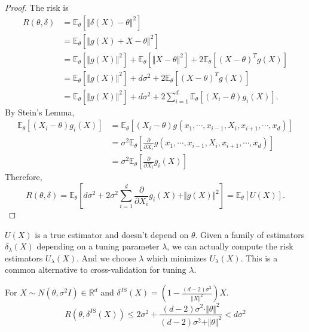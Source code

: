 \documentclass[a4paper]{article}
\begin{document}
\begin{proof}
	The risk is
	\begin{equation}
		\begin{aligned}
			R(\theta,\delta) &= \mathbb{E}_\theta[\Vert \delta(X) - \theta \Vert^2] \\
			&= \mathbb{E}_\theta[\Vert g(X) + X - \theta \Vert^2] \\
			&= \mathbb{E}_\theta[\Vert g(X) \Vert^2] + \mathbb{E}_\theta[\Vert X - \theta \Vert^2] + 2\mathbb{E}_\theta[(X - \theta)^T g(X)] \\
			&= \mathbb{E}_\theta[\Vert g(X) \Vert^2] + d\sigma^2 + 2\mathbb{E}_\theta[(X - \theta)^T g(X)] \\
			&= \mathbb{E}_\theta[\Vert g(X) \Vert^2] + d\sigma^2 + 2\sum\limits_{i=1}^d \mathbb{E}_\theta[(X_i - \theta) g_i(X)].
		\end{aligned}
	\end{equation}
	By Stein's Lemma,
	\begin{equation}
		\begin{aligned}
			\mathbb{E}_\theta[(X_i - \theta) g_i(X)] &= \mathbb{E}_\theta[(X_i - \theta) g(x_1,\cdots,x_{i-1},X_i,x_{i+1},\cdots,x_d)] \\
			&= \sigma^2\mathbb{E}_\theta\left[\frac{\partial}{\partial X_i}g(x_1,\cdots,x_{i-1},X_i,x_{i+1},\cdots,x_d)\right] \\
			&= \sigma^2\mathbb{E}_\theta\left[\frac{\partial}{\partial X_i}g_i(X)\right]
		\end{aligned}
	\end{equation}
	Therefore,
	\begin{equation}
		R(\theta,\delta) = \mathbb{E}_\theta\left[d\sigma^2 + 2\sigma^2\sum\limits_{i=1}^d\frac{\partial}{\partial X_i}g_i(X)+\Vert g(X) \Vert^2\right] = \mathbb{E}_\theta[U(X)].
	\end{equation}
\end{proof}

\begin{remark}
	$U(X)$ is a true estimator and doesn't depend on $\theta$. Given a family of estimators $\delta_\lambda(X)$ depending on a tuning parameter $\lambda$, we can actually compute the risk estimators $U_\lambda(X)$. And we choose $\lambda$ which minimizes $U_\lambda(X)$. This is a common alternative to cross-validation for tuning $\lambda$.
\end{remark}

\begin{thm}
	For $X \sim N(\theta,\sigma^2I) \in \mathbb{R}^d$ and $\delta^{\text{JS}}(X) = \left(1-\frac{(d-2)\sigma^2}{\Vert X \Vert ^2}\right)X$.
	\begin{equation}
		R(\theta,\delta^{\text{JS}}(X)) \leq 2\sigma^2 + \frac{(d-2) \sigma^2 \cdot \Vert \theta \Vert ^2}{(d-2) \sigma^2 + \Vert \theta \Vert ^2} < d\sigma^2
	\end{equation}
\end{thm}
\end{document}
